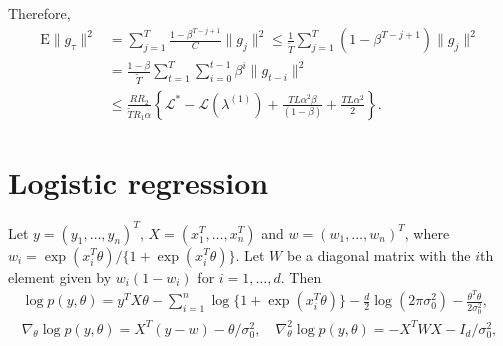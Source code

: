 \documentclass{statsoc}
\newcommand\E{{\text{E}}}
\newcommand\mL{{\mathcal{L}}}
\begin{document}
Therefore,
\begin{align*}
\E\|g_\tau \|^2 &= \sum_{j=1}^T \frac{1 - \beta^{T-j+1}}{C} \|g_j \|^2  \leq  \frac{1}{\widetilde{T}}\sum_{j=1}^T (1-\beta^{T-j+1})\| g_{j} \|^2\\
&= \frac{1-\beta}{\widetilde{T}}  \sum_{t=1}^T \sum_{i=0}^{t-1} \beta^i \| g_{t-i} \|^2 \\
& \leq \frac{R R_2}{\widetilde{T} R_1 \alpha} \left\{ \mL^* - \mL(\lambda^{(1)}) + \frac{TL\alpha ^2 \beta }{(1-\beta)}  + \frac{TL \alpha^2}{2} \right\}.
\end{align*}

\section{Logistic regression}
Let $y=(y_1, \dots, y_n)^T $, $X= (x_1^T , \dots, x_n^T )$ and $w = (w_1, \dots, w_n)^T $, where $w_i = \exp(x_i^T  \theta)/\{1+\exp(x_i^T  \theta)\}$. Let $W$ be a diagonal matrix with the $i$th element given by $w_i(1-w_i)$ for $i=1, \dots, d$. Then
\[
\begin{gathered}
\log p(y, \theta) = y^T  X \theta - \sum_{i=1}^n \log \{1 + \exp(x_i^T  \theta)\} - \frac{d}{2} \log (2\pi \sigma_0^2) - \frac{\theta^T  \theta}{2 \sigma_0^2}, \\
\nabla_\theta \log p(y, \theta)  = X^T  (y- w) - \theta/\sigma_0^2, 
\quad
\nabla_\theta^2  \log p(y, \theta) = - X^T W X - I_d/\sigma_0^2,
\end{gathered}
\]
\end{document}
